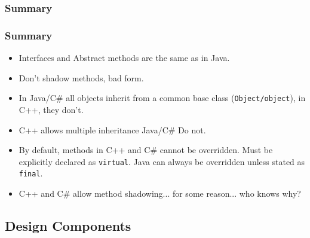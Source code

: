 \documentclass{beamer}
\begin{document}
\subsubsection{Summary}
\begin{frame}
\frametitle{Summary}
\begin{itemize}
\item Interfaces and Abstract methods are the same as in Java.
\item Don't shadow methods, bad form.
\item In Java/C\# all objects inherit from a common base class (\texttt{Object/object}), in C++, they don't.
\item {\color{green} C++ allows multiple inheritance} {\color{red} Java/C\# Do not}.
\item By default, methods in C++ and C\# cannot be overridden. Must be explicitly declared as \texttt{virtual}. Java can always be overridden unless stated as \texttt{final}.
\item C++ and C\# allow method shadowing... for some reason... who knows why?
\end{itemize}
\end{frame}

\subsection{Design Components}
\end{document}
